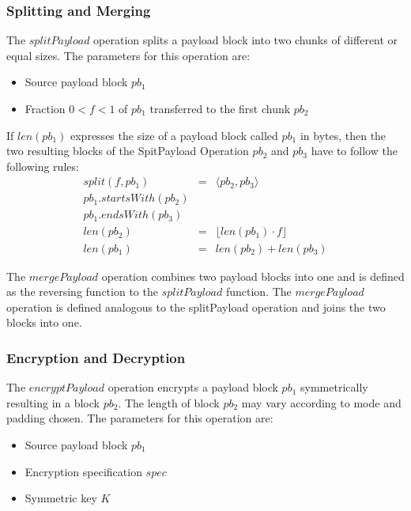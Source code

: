 \documentclass[10pt,journal,compsoc,twocolumn,twoside]{IEEEtran}
\begin{document}
\subsubsection{Splitting and Merging}
The $splitPayload$ operation splits a payload block into two chunks of different or equal sizes. The parameters for this operation are:
\begin{itemize}
	\item Source payload block $pb_1$
	\item Fraction $0<f<1$ of $pb_1$ transferred to the first chunk $pb_2$
\end{itemize}

If $len(pb_1)$ expresses the size of a payload block called $pb_1$ in bytes, then the two resulting blocks of the SpitPayload Operation $pb_2$ and $pb_3$ have to follow the following rules:
\begin{eqnarray}
split(f, pb_1) & = &\langle pb_2, pb_3 \rangle\\
pb_1.startsWith(pb_2)\\
pb_1.endsWith(pb_3)\\
len(pb_2) & = & \lfloor len(pb_1)\cdot f\rfloor\\
len(pb_1) & = & len(pb_2) + len(pb_3)
\end{eqnarray}

The $mergePayload$ operation combines two payload blocks into one and is defined as the reversing function to the $splitPayload$ function. 
%
%
%
The $mergePayload$ operation is defined analogous to the splitPayload operation and joins the two blocks into one.
%

\subsubsection{Encryption and Decryption}
The $encryptPayload$ operation encrypts a payload block $pb_1$ symmetrically resulting in a block $pb_2$. The length of block $pb_2$ may vary according to mode and padding chosen. The parameters for this operation are:
\begin{itemize}
	\item Source payload block $pb_1$
	\item Encryption specification $spec$
	\item Symmetric key $K$
\end{itemize}
\end{document}
